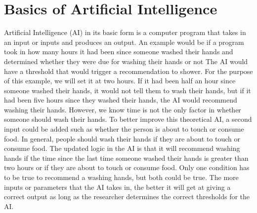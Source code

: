 \documentclass[]{article}
\begin{document}
	\section{Basics of Artificial Intelligence}\label{introtoai}
		
		Artificial Intelligence (AI) in its basic form is a computer program that takes in an input or inputs and produces an output. An example would be if a program took in how many hours it had been since someone washed their hands and determined whether they were due for washing their hands or not The AI would have a threshold that would trigger a recommendation to shower. For the purpose of this example, we will set it at two hours. If it had been half an hour since someone washed their hands, it would not tell them to wash their hands, but if it had been five hours since they washed their hands, the AI would recommend washing their hands. However, we know time is not the only factor in whether someone should wash their hands. To better improve this theoretical AI, a second input could be added such as whether the person is about to touch or consume food. In general, people should wash their hands if they are about to touch or consume food. The updated logic in the AI is that it will recommend washing hands if the time since the last time someone washed their hands is greater than two hours or if they are about to touch or consume food. Only one condition has to be true to recommend a washing hands, but both could be true. The more inputs or parameters that the AI takes in, the better it will get at giving a correct output as long as the researcher determines the correct thresholds for the AI.
	
\end{document}
